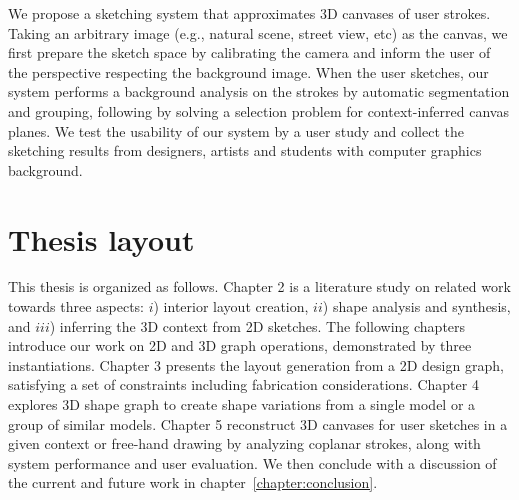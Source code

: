 We propose a sketching system that approximates 3D canvases of user strokes. Taking an arbitrary image (e.g., natural scene, street view, etc) as the canvas, we first prepare the sketch space by calibrating the camera and inform the user of the perspective respecting the background image. When the user sketches, our system performs a background analysis on the strokes by automatic segmentation and grouping, following by solving a selection problem for context-inferred canvas planes. We test the usability of our system by a user study and collect the sketching results from designers, artists and students with computer graphics background.

\section{Thesis layout}

This thesis is organized as follows. Chapter 2 is a literature study on related work towards three aspects: $i$) interior layout creation, $ii$) shape analysis and synthesis, and $iii$) inferring the 3D context from 2D sketches. The following chapters introduce our work on 2D and 3D graph operations, demonstrated by three instantiations. Chapter 3 presents the layout generation from a 2D design graph, satisfying a set of constraints including fabrication considerations. Chapter 4 explores 3D shape graph to create shape variations from a single model or a group of similar models. Chapter 5 reconstruct 3D canvases for user sketches in a given context or free-hand drawing by analyzing coplanar strokes, along with system performance and user evaluation. We then conclude with a discussion of the current and future work in chapter~\ref{chapter:conclusion}.
